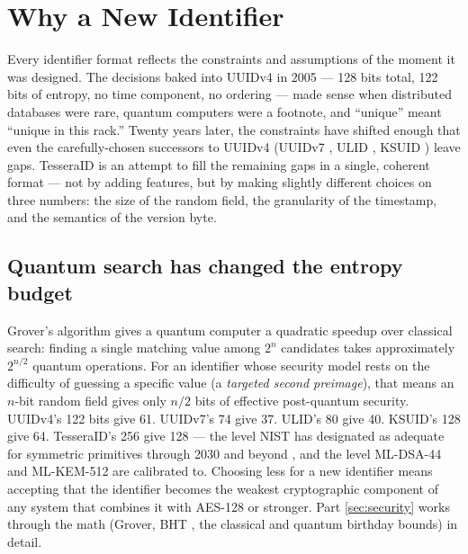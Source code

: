 \section{Why a New Identifier}
\label{sec:why}

Every identifier format reflects the constraints and assumptions of the moment it was designed. The decisions baked into UUIDv4 \citep{rfc4122} in 2005 --- 128 bits total, 122 bits of entropy, no time component, no ordering --- made sense when distributed databases were rare, quantum computers were a footnote, and ``unique'' meant ``unique in this rack.'' Twenty years later, the constraints have shifted enough that even the carefully-chosen successors to UUIDv4 (UUIDv7 \citep{rfc9562}, ULID \citep{ulid}, KSUID \citep{ksuid}) leave gaps. TesseraID is an attempt to fill the remaining gaps in a single, coherent format --- not by adding features, but by making slightly different choices on three numbers: the size of the random field, the granularity of the timestamp, and the semantics of the version byte.

\subsection{Quantum search has changed the entropy budget}

Grover's algorithm \citep{grover1996} gives a quantum computer a quadratic speedup over classical search: finding a single matching value among $2^n$ candidates takes approximately $2^{n/2}$ quantum operations. For an identifier whose security model rests on the difficulty of guessing a specific value (a \emph{targeted second preimage}), that means an $n$-bit random field gives only $n/2$ bits of effective post-quantum security. UUIDv4's 122 bits give 61. UUIDv7's 74 give 37. ULID's 80 give 40. KSUID's 128 give 64. TesseraID's 256 give 128 --- the level NIST has designated as adequate for symmetric primitives through 2030 and beyond \citep{nist80057}, and the level ML-DSA-44 \citep{fips204} and ML-KEM-512 \citep{fips203} are calibrated to. Choosing less for a new identifier means accepting that the identifier becomes the weakest cryptographic component of any system that combines it with AES-128 \citep{fips197} or stronger. Part \ref{sec:security} works through the math (Grover, BHT \citep{bht1998}, the classical and quantum birthday bounds) in detail.

